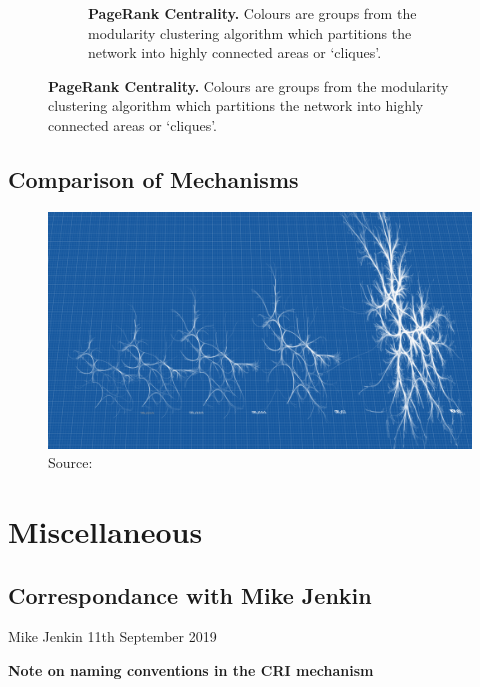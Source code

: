 \begin{figure}[H]
\begin{subfigure}[t]{.49\textwidth}
        \caption{ \textbf{PageRank Centrality.} Colours are groups from the modularity clustering algorithm which partitions the network into highly connected areas or `cliques'.}
\end{subfigure}
\end{figure}


\section{Comparison of Mechanisms}
\begin{figure}[H]
\centering
\includegraphics[width=.9\textheight,angle=90]{mechcompare.png}
{Source:\cite{mcmblue}}
\end{figure}




\chapter{Miscellaneous}




\section{Correspondance with Mike Jenkin}\label{appendix:correspondance}
Mike Jenkin 11th September 2019

\textbf{Note on naming conventions in the CRI mechanism}\\

